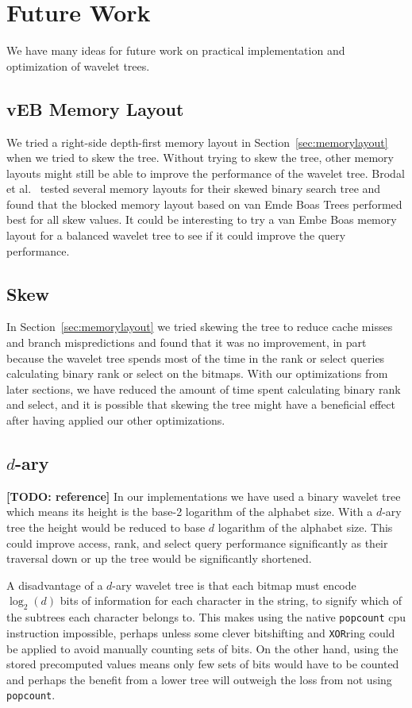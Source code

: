 \section{Future Work}
We have many ideas for future work on practical implementation and optimization of wavelet trees.

\subsection{vEB Memory Layout}
\label{sec:futurework_vebmemorylayout}
We tried a right-side depth-first memory layout in Section~\ref{sec:memorylayout} when we tried to skew the tree.
Without trying to skew the tree, other memory layouts might still be able to improve the performance of the wavelet tree.
Brodal et al.~ tested several memory layouts for their skewed binary search tree and found that the blocked memory layout based on van Emde Boas Trees performed best for all skew values.
It could be interesting to try a van Embe Boas memory layout for a balanced wavelet tree to see if it could improve the query performance.

\subsection{Skew}
In Section~\ref{sec:memorylayout} we tried skewing the tree to reduce cache misses and branch mispredictions and found that it was no improvement, in part because the wavelet tree spends most of the time in the rank or select queries calculating binary rank or select on the bitmaps.
With our optimizations from later sections, we have reduced the amount of time spent calculating binary rank and select, and it is possible that skewing the tree might have a beneficial effect after having applied our other optimizations.

\subsection{$d$-ary}
\textbf{[TODO: reference]}
In our implementations we have used a binary wavelet tree which means its height is the base-2 logarithm of the alphabet size.
With a $d$-ary tree the height would be reduced to base $d$ logarithm of the alphabet size.
This could improve access, rank, and select query performance significantly as their traversal down or up the tree would be significantly shortened.

A disadvantage of a $d$-ary wavelet tree is that each bitmap must encode $\log_2(d)$ bits of information for each character in the string, to signify which of the subtrees each character belongs to.
This makes using the native \texttt{popcount} cpu instruction impossible, perhaps unless some clever bitshifting and \texttt{XOR}ring could be applied to avoid manually counting sets of bits.
On the other hand, using the stored precomputed values means only few sets of bits would have to be counted and perhaps the benefit from a lower tree will outweigh the loss from not using \texttt{popcount}.

